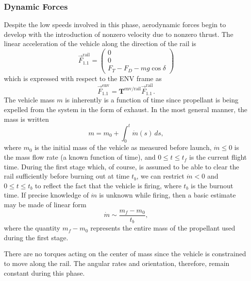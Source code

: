 \documentclass[11pt,dvipsnames]{thesis}
\begin{document}
\subsubsection{Dynamic Forces}
Despite the low speeds involved in this phase, aerodynamic forces begin to develop with the introduction of nonzero velocity due to nonzero thrust. The linear acceleration of the vehicle along the direction of the rail is
\begin{equation}
\vec{F}_{1.1}^{\text{rail}} = \begin{pmatrix}0 \\ 0 \\ F_T - F_D - mg\cos\delta\end{pmatrix}
\end{equation}
which is expressed with respect to the ENV frame as
\begin{equation}
\vec{F}_{1.1}^{\text{env}} = \mathbf{T}^{\text{env}/\text{rail}} \vec{F}_{1.1}^{\text{rail}}.
\end{equation}
The vehicle mass $m$ is inherently is a function of time since propellant is being expelled from the system in the form of exhaust. In the most general manner, the mass is written
\begin{equation}
m = m_0 + \int_0^t \dot{m}(s)\,ds,
\end{equation}
where $m_0$ is the initial mass of the vehicle as measured before launch, $\dot{m} \leqslant 0$ is the mass flow rate (a known function of time), and $0 \leqslant t \leqslant t_f$ is the current flight time. During the first stage which, of course, is assumed to be able to clear the rail sufficiently before burning out at time $t_b$, we can restrict $\dot{m} < 0$ and $0 \leqslant t \leqslant t_b$ to reflect the fact that the vehicle is firing, where $t_b$ is the burnout time.
If precise knowledge of $\dot{m}$ is unknown while firing, then a basic estimate may be made of linear form
\begin{equation}
\dot{m} \sim \frac{m_f - m_0}{t_b},
\end{equation}
where the quantity $m_f - m_0$ represents the entire mass of the propellant used during the first stage.

There are no torques acting on the center of mass since the vehicle is constrained to move along the rail. The angular rates and orientation, therefore, remain constant during this phase.
\end{document}

